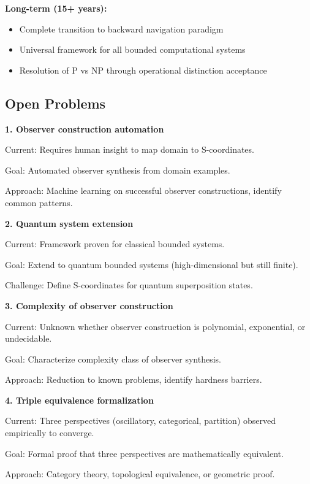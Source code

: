 \documentclass[twocolumn,10pt]{article}
\theoremstyle{definition}
\theoremstyle{remark}
\begin{document}
\textbf{Long-term (15+ years):}
\begin{itemize}
\item Complete transition to backward navigation paradigm
\item Universal framework for all bounded computational systems
\item Resolution of P vs NP through operational distinction acceptance
\end{itemize}

\subsection{Open Problems}

\textbf{1. Observer construction automation}

Current: Requires human insight to map domain to S-coordinates.

Goal: Automated observer synthesis from domain examples.

Approach: Machine learning on successful observer constructions, identify common patterns.

\vspace{0.2cm}
\noindent\textbf{2. Quantum system extension}

Current: Framework proven for classical bounded systems.

Goal: Extend to quantum bounded systems (high-dimensional but still finite).

Challenge: Define S-coordinates for quantum superposition states.

\vspace{0.2cm}
\noindent\textbf{3. Complexity of observer construction}

Current: Unknown whether observer construction is polynomial, exponential, or undecidable.

Goal: Characterize complexity class of observer synthesis.

Approach: Reduction to known problems, identify hardness barriers.

\vspace{0.2cm}
\noindent\textbf{4. Triple equivalence formalization}

Current: Three perspectives (oscillatory, categorical, partition) observed empirically to converge.

Goal: Formal proof that three perspectives are mathematically equivalent.

Approach: Category theory, topological equivalence, or geometric proof.
\end{document}
